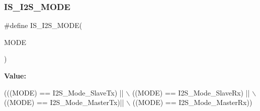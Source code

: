 \subsubsection{\texorpdfstring{I\+S\+\_\+\+I2\+S\+\_\+\+M\+O\+DE}{IS\_I2S\_MODE}}
{\footnotesize\ttfamily \#define I\+S\+\_\+\+I2\+S\+\_\+\+M\+O\+DE(\begin{DoxyParamCaption}\item[{}]{M\+O\+DE }\end{DoxyParamCaption})}

{\bfseries Value\+:}
\begin{DoxyCode}
(((MODE) == I2S\_Mode\_SlaveTx) || \(\backslash\)
                           ((MODE) == I2S\_Mode\_SlaveRx) || \(\backslash\)
                           ((MODE) == I2S\_Mode\_MasterTx)|| \(\backslash\)
                           ((MODE) == I2S\_Mode\_MasterRx))
\end{DoxyCode}
